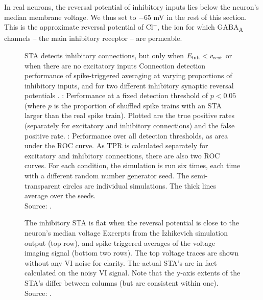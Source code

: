 In real neurons, the reversal potential of inhibitory inputs lies below the neuron's median membrane voltage. We thus set \vinh to $-65$ mV in the rest of this section. This is the approximate reversal potential of $\mathrm{Cl}^-$, the ion for which GABA\textsubscript{A} channels -- the main inhibitory receptor -- are permeable.\cite{Dayan2001TheoreticalNeuroscienceComputational,Kandel2013PrinciplesNeuralScience}

\begin{figure}
  \captionn
  {STA detects inhibitory connections, but only when $E_{\text{inh}} < v_\text{rest}$ or when there are no excitatory inputs}
  {
    Connection detection performance of spike-triggered averaging at varying proportions of inhibitory inputs, and for two different inhibitory synaptic reversal potentials \vinh.
    \Top: Performance at a fixed detection threshold of $p < 0.05$ (where $p$ is the proportion of shuffled spike trains with an STA larger than the real spike train). Plotted are the true positive rates (separately for excitatory and inhibitory connections) and the false positive rate.
    \Bottom: Performance over all detection thresholds, as
    area under the ROC curve. As TPR is calculated separately for excitatory and inhibitory connections, there are also two ROC curves.
    For each condition, the simulation is run six times, each time with a different random number generator seed. The semi-transparent circles are individual simulations. The thick lines average over the seeds.\\
    Source: .
  }
  \label{fig:N_1_IE}
\end{figure}

\begin{figure}
    \hspace*{-2.5em}
  \captionn
  {The inhibitory STA is flat when the reversal potential is close to the neuron's median voltage}
  {Excerpts from the Izhikevich simulation output (top row), and spike triggered averages of the voltage imaging signal (bottom two rows). The top voltage traces are shown without any VI noise for clarity. The actual STA's are in fact calculated on the noisy VI signal. Note that the y-axis extents of the STA's differ between columns (but are consistent within one).\\
  Source: .}
  \label{fig:N_1_signals}
\end{figure}


